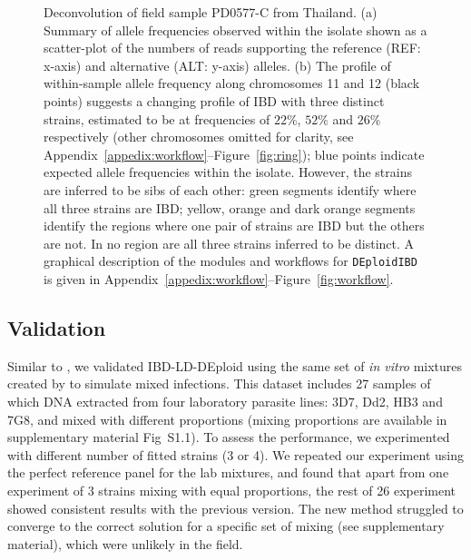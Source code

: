 \documentclass[9pt,lineno]{elife}
\begin{document}
\begin{figure}[ht]
  \centering{}
   \caption{Deconvolution of field sample PD0577-C from Thailand.  (a) Summary of allele frequencies observed within the isolate shown as a scatter-plot of the numbers of reads supporting the reference (REF: x-axis) and alternative (ALT: y-axis) alleles. (b) The profile of within-sample allele frequency along chromosomes 11 and 12 (black points) suggests a changing profile of IBD with three distinct strains, estimated to be at frequencies of $22\%$, $52\%$ and $26\%$ respectively (other chromosomes omitted for clarity, see Appendix~\ref{appedix:workflow}--Figure~\ref{fig:ring}); blue points indicate expected allele frequencies within the isolate.  However, the strains are inferred to be sibs of each other: green segments identify where all three strains are IBD; yellow, orange and dark orange segments identify the regions where one pair of strains are IBD but the others are not.  In no region are all three strains inferred to be distinct. A graphical description of the modules and workflows for \texttt{DEploidIBD} is given in Appendix~\ref{appedix:workflow}--Figure~\ref{fig:workflow}.}\label{fig:fig1}
\end{figure}


\subsection{Validation}
Similar to \citep{Zhu2017}, we validated IBD-LD-DEploid using the same set of {\it in vitro} mixtures created by \citet{Wendler2015} to simulate mixed infections. This dataset includes 27 samples of which DNA extracted from four laboratory parasite lines: 3D7, Dd2, HB3 and 7G8, and mixed with different proportions (mixing proportions are available in supplementary material Fig~S1.1). To assess the performance, we experimented with different number of fitted strains (3 or 4). We repeated our experiment using the perfect reference panel for the lab mixtures, and found that apart from one experiment of 3 strains mixing with equal proportions, the rest of 26 experiment showed consistent results with the previous version. The new method struggled to converge to the correct solution for a specific set of mixing (see supplementary material), which were unlikely in the field.
\end{document}
